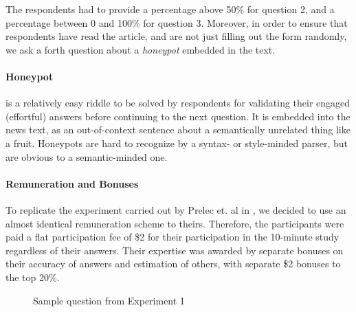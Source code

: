 \documentclass{report}
\theoremstyle{definition}
\begin{document}
The respondents had to provide a percentage above 50\% for question 2, and a percentage between 0 and 100\% for question 3. Moreover, in order to ensure that respondents have read the article, and are not just filling out the form randomly, we ask a forth question about a \emph{honeypot} embedded in the text.

\paragraph{Honeypot} is a relatively easy riddle to be solved by respondents for validating their engaged (effortful) answers before continuing to the next question. It is embedded into the news text, as an out-of-context sentence about a semantically unrelated thing like a fruit. Honeypots are hard to recognize by a syntax- or style-minded parser, but are obvious to a semantic-minded one.

\paragraph{Remuneration and Bonuses} To replicate the experiment carried out by Prelec et. al in \cite{prelec:nature}, we decided to use an almost identical remuneration scheme to theirs. Therefore, the participants were paid a flat participation fee of \$2 for their participation in the 10-minute study regardless of their answers. Their expertise was awarded by separate bonuses on their accuracy of answers and estimation of others, with separate \$2 bonuses to the top 20\%.

\begin{figure}[H]
    \centering
    \vspace*{-2cm}
    \caption{Sample question from Experiment 1}
    \label{fig:sample_question}
\end{figure}
\end{document}
